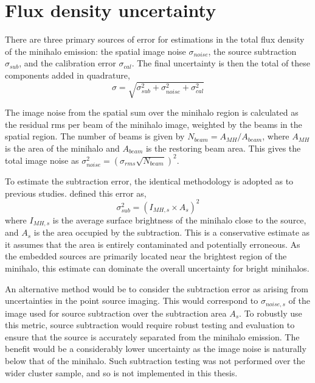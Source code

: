 \section{Flux density uncertainty}
\label{sec:calibration_error}
There are three primary sources of error for estimations in the total flux density of the minihalo emission: the spatial image noise $\sigma_{noise}$, the source subtraction $\sigma_{sub}$, and the calibration error $\sigma_{cal}$. The final uncertainty is then the total of these components added in quadrature,\begin{equation}
    \sigma = \sqrt{\sigma_{sub}^2 + \sigma_{noise}^2 + \sigma_{cal}^2} 
\end{equation}

The image noise from the spatial sum over the minihalo region is calculated as the residual rms per beam of the minihalo image, weighted by the beams in the spatial region. The number of beams is given by $N_{beam} = A_{MH} / A_{beam}$, where $A_{MH}$ is the area of the minihalo  and $A_{beam}$ is the restoring beam area. This gives the total image noise as $\sigma_{noise}^2 = (\sigma_{rms}\sqrt{N_{beam}})^2$.

To estimate the subtraction error, the identical methodology is adopted as to previous studies. \citet{Giacintucci2014a} defined this error as,
\begin{equation}
    \sigma_{sub}^2 = \left(I_{MH,s} \times A_{s}\right)^2
\end{equation}
where $I_{MH,s}$ is the average surface brightness of the minihalo close to the source, and $A_s$ is the area occupied by the subtraction. This is a conservative estimate as it assumes that the area is entirely contaminated and potentially erroneous. As the embedded sources are primarily located near the brightest region of the minihalo, this estimate can dominate the overall uncertainty for bright minihalos.

An alternative method would be to consider the subtraction error as arising from uncertainties in the point source imaging. This would correspond to $\sigma_{noise,s}$ of the image used for source subtraction over the subtraction area $A_s$. To robustly use this metric, source subtraction would require robust testing and evaluation to ensure that the source is accurately separated from the minihalo emission. The benefit would be a considerably lower uncertainty as the image noise is naturally below that of the minihalo. Such subtraction testing was not performed over the wider cluster sample, and so is not implemented in this thesis. 

